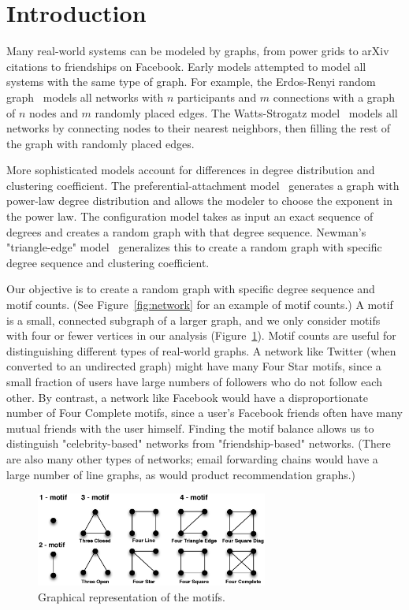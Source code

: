 \section{Introduction}
\label{sec:intro}

Many real-world systems can be modeled by graphs, from power grids to arXiv citations to friendships on Facebook.  Early models attempted to model all systems with the same type of graph.  For example, the Erdos-Renyi random graph~\cite{erdds1959random}\cite{erdos1960random} models all networks with $n$ participants and $m$ connections with a graph of $n$ nodes and $m$ randomly placed edges.  The Watts-Strogatz model~\cite{watts1998collective} models all networks by connecting nodes to their nearest neighbors, then filling the rest of the graph with randomly placed edges.

More sophisticated models account for differences in degree distribution and clustering coefficient.  The preferential-attachment model~\cite{albert2002statistical} generates a graph with power-law degree distribution and allows the modeler to choose the exponent in the power law.  The configuration model takes as input an exact sequence of degrees and creates a random graph with that degree sequence.  Newman's "triangle-edge" model~\cite{newman2009random} generalizes this to create a random graph with specific degree sequence and clustering coefficient.

Our objective is to create a random graph with specific degree sequence and
motif counts.  (See Figure~\ref{fig:network} for an example of motif
counts.)  A motif is a small, connected subgraph of a larger graph,
and we only consider motifs with four or fewer vertices in our analysis 
(Figure~\ref{fig:motif}).  Motif counts are useful for distinguishing different
types of real-world graphs.  A network like Twitter (when converted to an
undirected graph) might have many Four
Star motifs, since a small fraction of users have large numbers of
followers who do not follow each other.  By contrast, a network like
Facebook would have a disproportionate number of Four Complete motifs, 
since a user's Facebook friends often have many mutual friends with the
user himself.  Finding the motif balance allows us to distinguish
"celebrity-based" networks from "friendship-based" networks.  (There are
also many other types of networks; email forwarding chains would have a
large number of line graphs, as would product recommendation graphs.)

\begin{figure}[t]
\centering
\includegraphics[width=3in]{Figures/motifs1.eps}
\caption{Graphical representation of the motifs.}
\label{fig:motif}
\end{figure}


